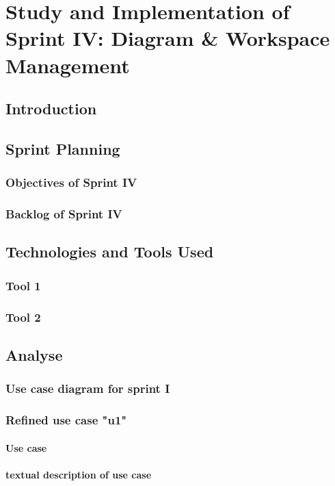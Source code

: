 \chapter[Sprint IV]{Study and Implementation of Sprint IV: Diagram \& Workspace Management}

\minitoc
\section{Introduction}
\section{Sprint Planning}
\subsection{Objectives of Sprint IV}
\subsection{Backlog of Sprint IV}
\section{Technologies and Tools Used}
\subsection{Tool 1}
\subsection{Tool 2}

\section{Analyse}
\subsection{Use case diagram for sprint I}
\subsection{Refined use case "u1"}
\subsubsection{Use case}
\subsubsection{textual description of use case}
